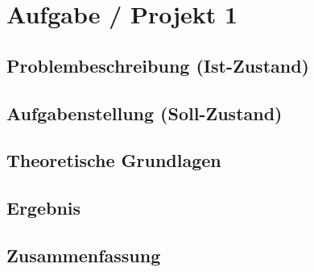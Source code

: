 \section{Aufgabe / Projekt 1}

\subsection{Problembeschreibung (Ist-Zustand)}
\subsection{Aufgabenstellung (Soll-Zustand)}
\subsection{Theoretische Grundlagen}
\subsection{Ergebnis}
\subsection{Zusammenfassung}